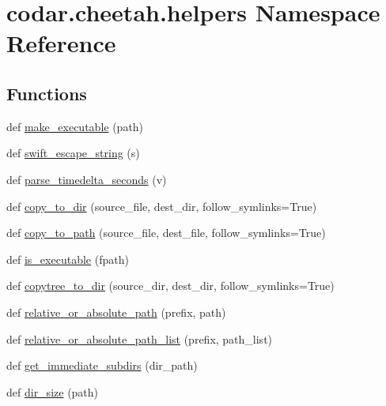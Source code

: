 \hypertarget{namespacecodar_1_1cheetah_1_1helpers}{}\section{codar.\+cheetah.\+helpers Namespace Reference}
\label{namespacecodar_1_1cheetah_1_1helpers}
\subsection*{Functions}
\begin{DoxyCompactItemize}
\item 
def \hyperlink{namespacecodar_1_1cheetah_1_1helpers_a2e29df35f1fb8df3960ad8a2a0dbb2b9}{make\+\_\+executable} (path)
\item 
def \hyperlink{namespacecodar_1_1cheetah_1_1helpers_a5cdfb8dfb312264379cb2db474d1cb18}{swift\+\_\+escape\+\_\+string} (s)
\item 
def \hyperlink{namespacecodar_1_1cheetah_1_1helpers_aefd230bdcbba1681b70244f39310b68b}{parse\+\_\+timedelta\+\_\+seconds} (v)
\item 
def \hyperlink{namespacecodar_1_1cheetah_1_1helpers_a229590ddcb3ea80584a1bd54503b852d}{copy\+\_\+to\+\_\+dir} (source\+\_\+file, dest\+\_\+dir, follow\+\_\+symlinks=True)
\item 
def \hyperlink{namespacecodar_1_1cheetah_1_1helpers_a0d950b9349d81a66ee6ceb2f6d527f27}{copy\+\_\+to\+\_\+path} (source\+\_\+file, dest\+\_\+file, follow\+\_\+symlinks=True)
\item 
def \hyperlink{namespacecodar_1_1cheetah_1_1helpers_a6852aa01d4b165b01beca98ce9b1ddfe}{is\+\_\+executable} (fpath)
\item 
def \hyperlink{namespacecodar_1_1cheetah_1_1helpers_a5699ff92469c138e5d44f6d64b505a11}{copytree\+\_\+to\+\_\+dir} (source\+\_\+dir, dest\+\_\+dir, follow\+\_\+symlinks=True)
\item 
def \hyperlink{namespacecodar_1_1cheetah_1_1helpers_a23099409c04805468db73bd84ee21cb3}{relative\+\_\+or\+\_\+absolute\+\_\+path} (prefix, path)
\item 
def \hyperlink{namespacecodar_1_1cheetah_1_1helpers_a97a25670924e4a57d6df60a2b4293244}{relative\+\_\+or\+\_\+absolute\+\_\+path\+\_\+list} (prefix, path\+\_\+list)
\item 
def \hyperlink{namespacecodar_1_1cheetah_1_1helpers_a8b3cf1f795749b30693bde31033207e6}{get\+\_\+immediate\+\_\+subdirs} (dir\+\_\+path)
\item 
def \hyperlink{namespacecodar_1_1cheetah_1_1helpers_a6dc162915bc1fde0814a35a63c6baacf}{dir\+\_\+size} (path)

\end{DoxyCompactItemize}
